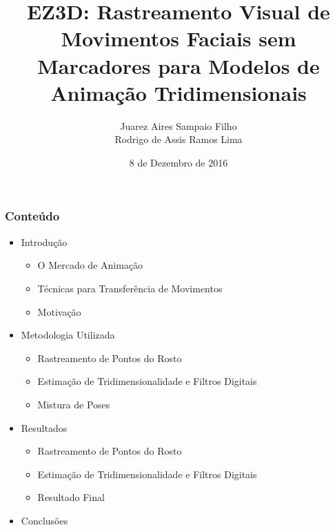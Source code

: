 \documentclass[brazil]{beamer}
\title{EZ3D: Rastreamento Visual de Movimentos Faciais sem Marcadores para Modelos de Animação Tridimensionais}
\author{Juarez Aires Sampaio Filho \\ Rodrigo de Assis Ramos Lima}
\institute{Universidade de Brasília}
\date{8 de Dezembro de 2016}
\begin{document}
\begin{frame}
        \titlepage
\end{frame}

\begin{frame}[fragile]
  \frametitle{Conteúdo}
  \begin{itemize}
     \item Introdução
     \begin{itemize}
     	\item O Mercado de Animação
     	\item Técnicas para Transferência de Movimentos
    	 	\item Motivação
   	 \end{itemize}
     \item Metodologia Utilizada
     \begin{itemize}
    	 	\item Rastreamento de Pontos do Rosto
    	 	\item Estimação de Tridimensionalidade e Filtros Digitais
    	 	\item Mistura de Poses
   	 \end{itemize}
     \item Resultados
     \begin{itemize}
    	 	\item Rastreamento de Pontos do Rosto
    	 	\item Estimação de Tridimensionalidade e Filtros Digitais
    	 	\item Resultado Final
   	 \end{itemize}
     \item Conclusões
  \end{itemize}
\end{frame}
\end{document}
